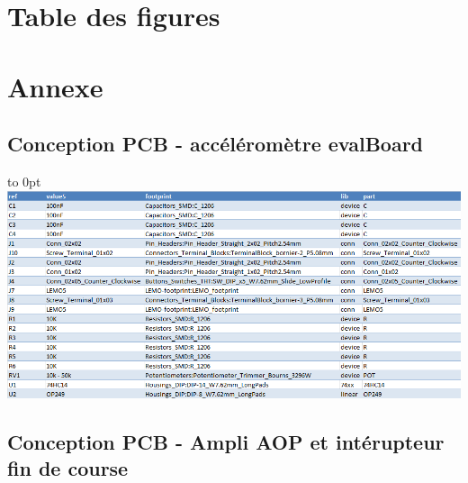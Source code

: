 \documentclass[french,a4paper,12pt]{report}
\begin{document}
\part{Table des figures}

	\listoffigures
	
\part{Annexe}

	\chapter{Conception PCB - accéléromètre evalBoard}
		
			
		
		
		
			
		\hfill\hbox to 0pt{\hss\includegraphics[width=15cm]{Liste_compos.png}\hss}\hfill\null\newline
			
	\chapter{Conception PCB - Ampli AOP et intérupteur fin de course}
		
			
		
		
		
			
				
		
\end{document}
